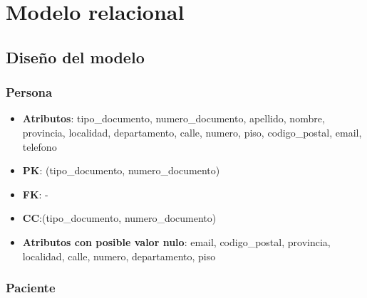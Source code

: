 \documentclass[a4paper,11pt]{article}
\begin{document}
\newpage

\section{\textbf{Modelo relacional\label{HToc293405831}}}

\subsection{\textbf{Diseño del modelo\label{HToc293405832}}}

\subsubsection{\textbf{Persona}}

\begin{itemize}

\item 
\textbf{Atributos}: tipo\_documento, numero\_documento, apellido, nombre, provincia, localidad, departamento, calle, numero, piso, codigo\_postal, email, telefono

\item 
\textbf{PK}: (tipo\_documento, numero\_documento)

\item
\textbf{FK}: -

\item 
\textbf{CC}:(tipo\_documento, numero\_documento)

\item 
\textbf{Atributos con posible valor nulo}: email, codigo\_postal, provincia, localidad, calle, numero, departamento, piso	
\end{itemize}

\subsubsection{\textbf{Paciente}}
\end{document}
